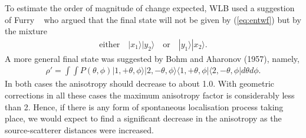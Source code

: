 \documentclass[11pt]{article}
\begin{document}
To estimate the order of magnitude of change expected, WLB used a suggestion of Furry ~\cite{wf36} who argued that the final state will not be given by (\ref{eq:entwf}) but by the mixture 
\begin{eqnarray}
\mbox{either}\quad                                                                                                                                                                                                                                                                                                                                                                                                                                                                                                                                                                                                                                                                                                                                                                                                                                                                                                                                                                                                                                                                                                                                                                                                                                                                                                                                                                                                                                                                                                                                                                                                                                                                                                                                                                         |x_1\rangle|y_2\rangle\quad\mbox{or}\quad   |y_1\rangle|x_2\rangle.  	\label{eq:simple}
\end{eqnarray}
A more general final state was suggested by Bohm and Aharonov (1957), namely,\cite{dbya57}
\begin{eqnarray}
\rho'=\int\int P(\theta, \phi)|1,+\theta,\phi\rangle|2,-\theta,\phi\rangle\langle1,+\theta,\phi|\langle 2,-\theta,\phi| d\theta d\phi.		\label{eq:mixed}
\end{eqnarray} 	
In both cases the anisotropy should decrease to about 1.0.  With geometric corrections in all these cases the maximum anisotropy factor is considerably less than 2. Hence, if there is any form of spontaneous localisation process taking place, we would expect to find a significant decrease in the anisotropy as the source-scatterer distances were increased. 
\end{document}
